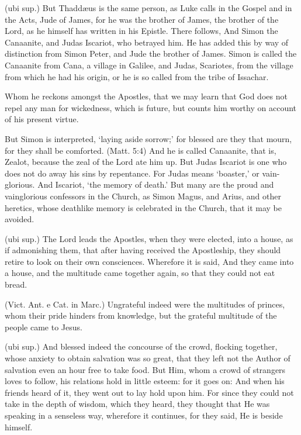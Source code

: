  (ubi sup.) But Thaddæus is the same person, as Luke calls in the Gospel and in the Acts, Jude of James, for he was the brother of James, the brother of the Lord, as he himself has written in his Epistle. There follows, And Simon the Canaanite, and Judas Iscariot, who betrayed him. He has added this by way of distinction from Simon Peter, and Jude the brother of James. Simon is called the Canaanite from Cana, a village in Galilee, and Judas, Scariotes, from the village from which he had his origin, or he is so called from the tribe of Issachar.

 Whom he reckons amongst the Apostles, that we may learn that God does not repel any man for wickedness, which is future, but counts him worthy on account of his present virtue.

 But Simon is interpreted, ‘laying aside sorrow;’ for blessed are they that mourn, for they shall be comforted. (Matt. 5:4) And he is called Canaanite, that is, Zealot, because the zeal of the Lord ate him up. But Judas Iscariot is one who does not do away his sins by repentance. For Judas means ‘boaster,’ or vain-glorious. And Iscariot, ‘the memory of death.’ But many are the proud and vainglorious confessors in the Church, as Simon Magus, and Arius, and other heretics, whose deathlike memory is celebrated in the Church, that it may be avoided.

 

 (ubi sup.) The Lord leads the Apostles, when they were elected, into a house, as if admonishing them, that after having received the Apostleship, they should retire to look on their own consciences. Wherefore it is said, And they came into a house, and the multitude came together again, so that they could not eat bread.

 (Vict. Ant. e Cat. in Marc.) Ungrateful indeed were the multitudes of princes, whom their pride hinders from knowledge, but the grateful multitude of the people came to Jesus.

 (ubi sup.) And blessed indeed the concourse of the crowd, flocking together, whose anxiety to obtain salvation was so great, that they left not the Author of salvation even an hour free to take food. But Him, whom a crowd of strangers loves to follow, his relations hold in little esteem: for it goes on: And when his friends heard of it, they went out to lay hold upon him. For since they could not take in the depth of wisdom, which they heard, they thought that He was speaking in a senseless way, wherefore it continues, for they said, He is beside himself.

